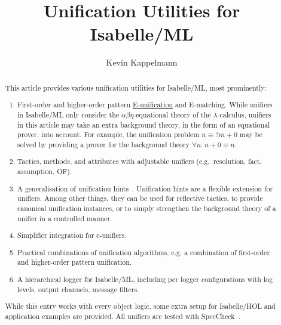 \documentclass[11pt,a4paper]{article}
\begin{document}
\title{Unification Utilities for Isabelle/ML}
\author{Kevin Kappelmann}
\maketitle

\begin{abstract}
This article provides various unification utilities for Isabelle/ML, most prominently:
\begin{enumerate}
\item First-order and higher-order pattern
\href{https://en.wikipedia.org/wiki/Unification_(computer_science)#E-unification}{E-unification}
and E-matching.
While unifiers in Isabelle/ML only consider the $\alpha\beta\eta$-equational theory of the $\lambda$-calculus,
unifiers in this article
may take an extra background theory, in the form of an equational prover, into account.
For example, the unification problem $n \equiv {}?m + 0$
may be solved by providing a prover for the background theory $\forall n.\ n + 0 \equiv n$.
\item Tactics, methods, and attributes with adjustable unifiers (e.g.\ resolution, fact, assumption, OF).
\item A generalisation of unification hints~\cite{unif-hints}.
Unification hints are a flexible extension for unifiers.
Among other things, they can be used for reflective tactics,
to provide canonical unification instances,
or to simply strengthen the background theory of a unifier in a controlled manner.
\item Simplifier integration for e-unifiers.
\item Practical combinations of unification algorithms, e.g. a combination of first-order and
higher-order pattern unification.
\item A hierarchical logger for Isabelle/ML,
including per logger configurations with log levels, output channels, message filters.
\end{enumerate}
While this entry works with every object logic,
some extra setup for Isabelle/HOL and application examples are provided.
All unifiers are tested with SpecCheck~\cite{speccheck}.
\end{abstract}

\tableofcontents





\end{document}
